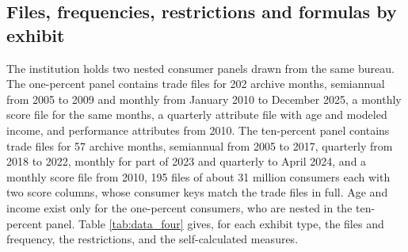 \subsection{Files, frequencies, restrictions and formulas by exhibit}\label{appendix:data:four}

The institution holds two nested consumer panels drawn from the same bureau. The one-percent panel contains trade files for 202 archive months, semiannual from 2005 to 2009 and monthly from January 2010 to December 2025, a monthly score file for the same months, a quarterly attribute file with age and modeled income, and performance attributes from 2010. The ten-percent panel contains trade files for 57 archive months, semiannual from 2005 to 2017, quarterly from 2018 to 2022, monthly for part of 2023 and quarterly to April 2024, and a monthly score file from 2010, 195 files of about 31 million consumers each with two score columns, whose consumer keys match the trade files in full. Age and income exist only for the one-percent consumers, who are nested in the ten-percent panel. Table \ref{tab:data_four} gives, for each exhibit type, the files and frequency, the restrictions, and the self-calculated measures.

